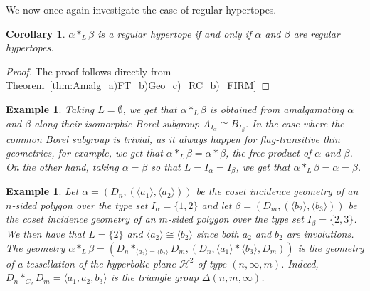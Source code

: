 \documentclass[11pt,letterpaper]{amsart}
\newtheorem{coro}[prop]{Corollary}
\newtheorem{example}[prop]{Example}
\begin{document}
We now once again investigate the case of regular hypertopes.

\begin{coro}
    $\alpha *_L \beta$ is a regular hypertope if and only if $\alpha$ and $\beta$ are regular hypertopes.
\end{coro}

\begin{proof}
    The proof follows directly from Theorem~\ref{thm:Amalg_a)FT_b)Geo_c)_RC_b)_FIRM}
\end{proof}

\begin{example}
    Taking $L = \emptyset$, we get that $\alpha *_L \beta$ is obtained from amalgamating $\alpha$ and $\beta$ along their isomorphic Borel subgroup $A_{I_\alpha} \cong B_{I_\beta}$. In the case where the common Borel subgroup is trivial, as it  always happen for flag-transitive thin geometries, for example, we get that $ \alpha *_L \beta = \alpha * \beta$, the free product of $\alpha$ and $\beta$.
    On the other hand, taking $\alpha = \beta$ so that $L = I_\alpha = I_\beta$, we get that $\alpha *_L \beta = \alpha = \beta$.
\end{example}

\begin{example}
    Let $\alpha = (D_n, (\langle a_1\rangle, \langle a_2 \rangle))$ be the coset incidence geometry of an $n$-sided polygon over the type set $I_\alpha = \{1,2\}$ and let $\beta =  (D_m, (\langle b_2\rangle, \langle b_3 \rangle))$ be the coset incidence geometry of an $m$-sided polygon over the type set $I_\beta = \{2,3\}$. We then have that $L = \{2\}$ and $\langle a_2 \rangle \cong \langle b_2 \rangle$ since both $a_2$ and $b_2$ are involutions. The geometry $\alpha *_L \beta = (D_n *_{\langle a_2 \rangle = \langle b_2 \rangle} D_m, (D_n, \langle a_1 \rangle * \langle b_3 \rangle , D_m))$ is the geometry of a tessellation of the hyperbolic plane $\mathcal{H}^2$ of type $(n, \infty, m)$. Indeed, $D_n *_{C_2} D_m = \langle a_1,a_2,b_3 \rangle$ is the triangle group $\Delta(n,m,\infty)$.
\end{example}

\end{document}
